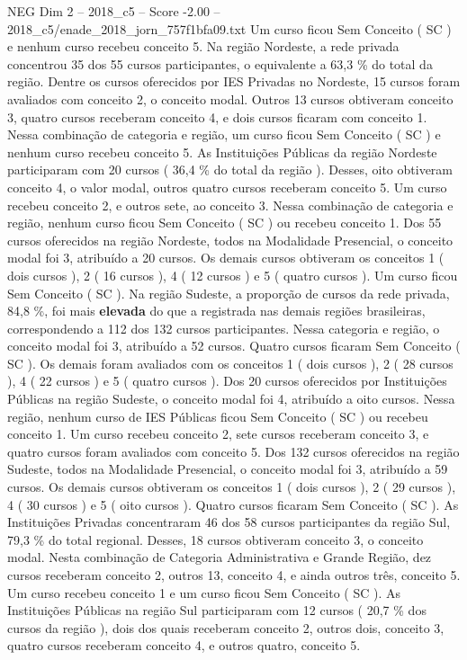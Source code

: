 \begin{textsample}{NEG Dim 2 – 2018\_c5 – Score -2.00 – 2018\_c5/enade\_2018\_jorn\_757f1bfa09.txt}
Um curso ficou Sem Conceito ( SC ) e nenhum curso recebeu conceito 5.
Na região Nordeste, a rede privada concentrou 35 dos 55 cursos participantes, o equivalente a 63,3 \% do total da região.
Dentre os cursos oferecidos por IES Privadas no Nordeste, 15 cursos foram avaliados com conceito 2, o conceito modal.
Outros 13 cursos obtiveram conceito 3, quatro cursos receberam conceito 4, e dois cursos ficaram com conceito 1.
Nessa combinação de categoria e região, um curso ficou Sem Conceito ( SC ) e nenhum curso recebeu conceito 5.
As Instituições Públicas da região Nordeste participaram com 20 cursos ( 36,4 \% do total da região ).
Desses, oito obtiveram conceito 4, o valor modal, outros quatro cursos receberam conceito 5.
Um curso recebeu conceito 2, e outros sete, ao conceito 3.
Nessa combinação de categoria e região, nenhum curso ficou Sem Conceito ( SC ) ou recebeu conceito 1.
Dos 55 cursos oferecidos na região Nordeste, todos na Modalidade Presencial, o conceito modal foi 3, atribuído a 20 cursos.
Os demais cursos obtiveram os conceitos 1 ( dois cursos ), 2 ( 16 cursos ), 4 ( 12 cursos ) e 5 ( quatro cursos ).
Um curso ficou Sem Conceito ( SC ).
Na região Sudeste, a proporção de cursos da rede privada, 84,8 \%, foi mais \textbf{elevada} do que a registrada nas demais regiões brasileiras, correspondendo a 112 dos 132 cursos participantes.
Nessa categoria e região, o conceito modal foi 3, atribuído a 52 cursos.
Quatro cursos ficaram Sem Conceito ( SC ).
Os demais foram avaliados com os conceitos 1 ( dois cursos ), 2 ( 28 cursos ), 4 ( 22 cursos ) e 5 ( quatro cursos ).
Dos 20 cursos oferecidos por Instituições Públicas na região Sudeste, o conceito modal foi 4, atribuído a oito cursos.
Nessa região, nenhum curso de IES Públicas ficou Sem Conceito ( SC ) ou recebeu conceito 1.
Um curso recebeu conceito 2, sete cursos receberam conceito 3, e quatro cursos foram avaliados com conceito 5.
Dos 132 cursos oferecidos na região Sudeste, todos na Modalidade Presencial, o conceito modal foi 3, atribuído a 59 cursos.
Os demais cursos obtiveram os conceitos 1 ( dois cursos ), 2 ( 29 cursos ), 4 ( 30 cursos ) e 5 ( oito cursos ).
Quatro cursos ficaram Sem Conceito ( SC ).
As Instituições Privadas concentraram 46 dos 58 cursos participantes da região Sul, 79,3 \% do total regional.
Desses, 18 cursos obtiveram conceito 3, o conceito modal.
Nesta combinação de Categoria Administrativa e Grande Região, dez cursos receberam conceito 2, outros 13, conceito 4, e ainda outros três, conceito 5.
Um curso recebeu conceito 1 e um curso ficou Sem Conceito ( SC ).
As Instituições Públicas na região Sul participaram com 12 cursos ( 20,7 \% dos cursos da região ), dois dos quais receberam conceito 2, outros dois, conceito 3, quatro cursos receberam conceito 4, e outros quatro, conceito 5.

\end{textsample}
